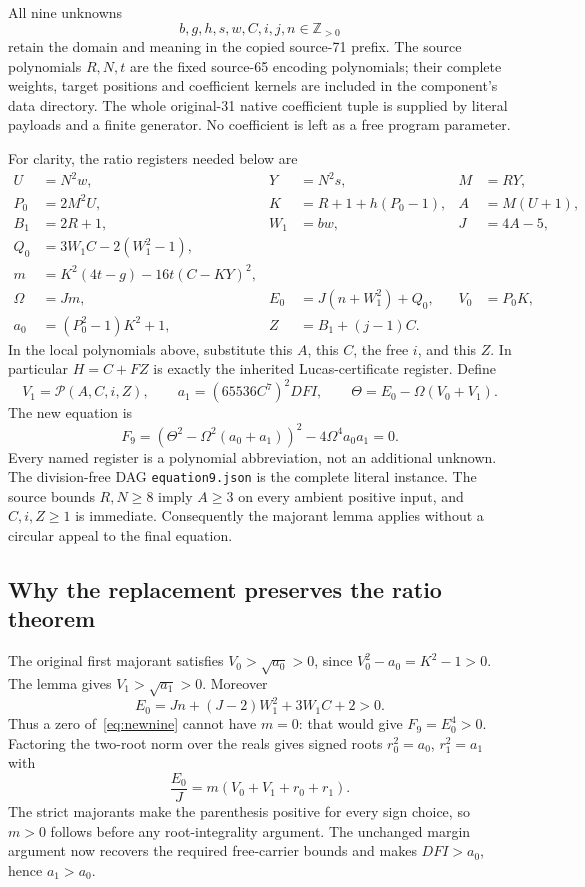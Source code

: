 All nine unknowns
\[
 b,g,h,s,w,C,i,j,n\in\mathbb Z_{>0}
\]
retain the domain and meaning in the copied source-71 prefix.  The source
polynomials $R,N,t$ are the fixed source-65 encoding polynomials; their
complete weights, target positions and coefficient kernels are included
in the component's data directory.  The whole original-31 native
coefficient tuple is supplied by literal payloads and a finite generator.
No coefficient is left as a free program parameter.

For clarity, the ratio registers needed below are
\begin{align*}
 U&=N^2w,&Y&=N^2s,& M&=RY,\\
 P_0&=2M^2U,&K&=R+1+h(P_0-1),&A&=M(U+1),\\
 B_1&=2R+1,&W_1&=bw,&J&=4A-5,\\
 Q_0&=3W_1C-2(W_1^2-1),&&&&\\[-6pt]
 m&=K^2(4t-g)-16t(C-KY)^2,&&&&\\
 \Omega&=Jm,&E_0&=J(n+W_1^2)+Q_0,&V_0&=P_0K,\\
 a_0&=(P_0^2-1)K^2+1,& Z&=B_1+(j-1)C.&&
\end{align*}
In the local polynomials above, substitute this $A$, this $C$, the free
$i$, and this $Z$.  In particular $H=C+FZ$ is exactly the inherited
Lucas-certificate register.  Define
\begin{equation}
 V_1=\mathcal P(A,C,i,Z),\qquad
 a_1=(65536C^7)^2DFI,\qquad
 \Theta=E_0-\Omega(V_0+V_1).                 \label{eq:newnineinputs}
\end{equation}
The new equation is
\begin{equation}
 \boxed{\quad
 F_9=(\Theta^2-\Omega^2(a_0+a_1))^2
                       -4\Omega^4a_0a_1=0.\quad}   \label{eq:newnine}
\end{equation}
Every named register is a polynomial abbreviation, not an additional
unknown.  The division-free DAG \texttt{equation9.json} is the complete
literal instance.  The source bounds $R,N\geq8$ imply $A\geq3$ on every
ambient positive input, and $C,i,Z\geq1$ is immediate.  Consequently the
majorant lemma applies without a circular appeal to the final equation.

\subsection{Why the replacement preserves the ratio theorem}

The original first majorant satisfies $V_0>\sqrt{a_0}>0$, since
$V_0^2-a_0=K^2-1>0$.  The lemma gives
$V_1>\sqrt{a_1}>0$.  Moreover
\[
 E_0=Jn+(J-2)W_1^2+3W_1C+2>0.
\]
Thus a zero of~\eqref{eq:newnine} cannot have $m=0$: that would give
$F_9=E_0^4>0$.  Factoring the two-root norm over the reals gives signed
roots $r_0^2=a_0$, $r_1^2=a_1$ with
\begin{equation}
 \frac{E_0}{J}=m(V_0+V_1+r_0+r_1).             \label{eq:marginorientation}
\end{equation}
The strict majorants make the parenthesis positive for every sign choice,
so $m>0$ follows before any root-integrality argument.  The unchanged
margin argument now recovers the required free-carrier bounds and makes
$DFI>a_0$, hence $a_1>a_0$.

